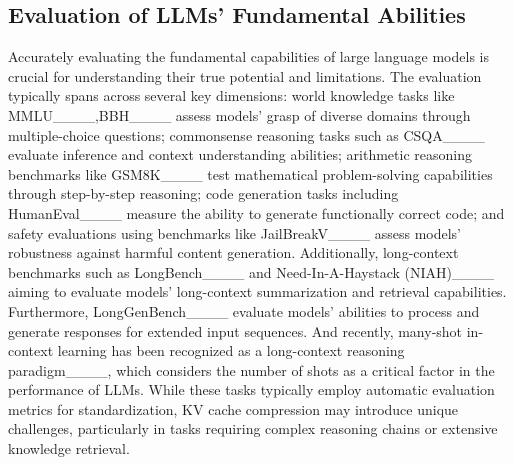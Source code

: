 \subsection{Evaluation of LLMs' Fundamental Abilities}
Accurately evaluating the fundamental capabilities of large language models is crucial for understanding their true potential and limitations. The evaluation typically spans across several key dimensions: world knowledge tasks like MMLU____,BBH____ assess models' grasp of diverse domains through multiple-choice questions; commonsense reasoning tasks such as CSQA____ evaluate inference and context understanding abilities; arithmetic reasoning benchmarks like GSM8K____ test mathematical problem-solving capabilities through step-by-step reasoning; code generation tasks including HumanEval____ measure the ability to generate functionally correct code; and safety evaluations using benchmarks like JailBreakV____ assess models' robustness against harmful content generation. Additionally, long-context benchmarks such as LongBench____ and Need-In-A-Haystack (NIAH)____ aiming to evaluate models' long-context summarization and retrieval capabilities. Furthermore, LongGenBench____ evaluate models' abilities to process and generate responses for extended input sequences. And recently, many-shot in-context learning has been recognized as a long-context reasoning paradigm____, which considers the number of shots as a critical factor in the performance of LLMs.
While these tasks typically employ automatic evaluation metrics for standardization, KV cache compression may introduce unique challenges, particularly in tasks requiring complex reasoning chains or extensive knowledge retrieval.



